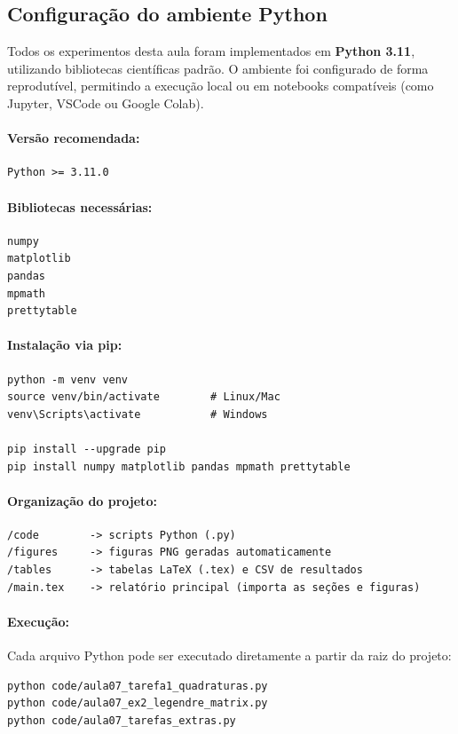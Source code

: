 \documentclass[12pt,a4paper]{article}
\begin{document}
\subsection{Configuração do ambiente Python}

Todos os experimentos desta aula foram implementados em \textbf{Python 3.11}, utilizando bibliotecas científicas padrão.  
O ambiente foi configurado de forma reprodutível, permitindo a execução local ou em notebooks compatíveis (como Jupyter, VSCode ou Google Colab).

\paragraph{Versão recomendada:}
\begin{verbatim}
Python >= 3.11.0
\end{verbatim}

\paragraph{Bibliotecas necessárias:}
\begin{verbatim}
numpy
matplotlib
pandas
mpmath
prettytable
\end{verbatim}

\paragraph{Instalação via pip:}
\begin{verbatim}
python -m venv venv
source venv/bin/activate        # Linux/Mac
venv\Scripts\activate           # Windows

pip install --upgrade pip
pip install numpy matplotlib pandas mpmath prettytable
\end{verbatim}

\paragraph{Organização do projeto:}
\begin{verbatim}
/code        -> scripts Python (.py)
/figures     -> figuras PNG geradas automaticamente
/tables      -> tabelas LaTeX (.tex) e CSV de resultados
/main.tex    -> relatório principal (importa as seções e figuras)
\end{verbatim}

\paragraph{Execução:}
Cada arquivo Python pode ser executado diretamente a partir da raiz do projeto:
\begin{verbatim}
python code/aula07_tarefa1_quadraturas.py
python code/aula07_ex2_legendre_matrix.py
python code/aula07_tarefas_extras.py
\end{verbatim}
\end{document}
